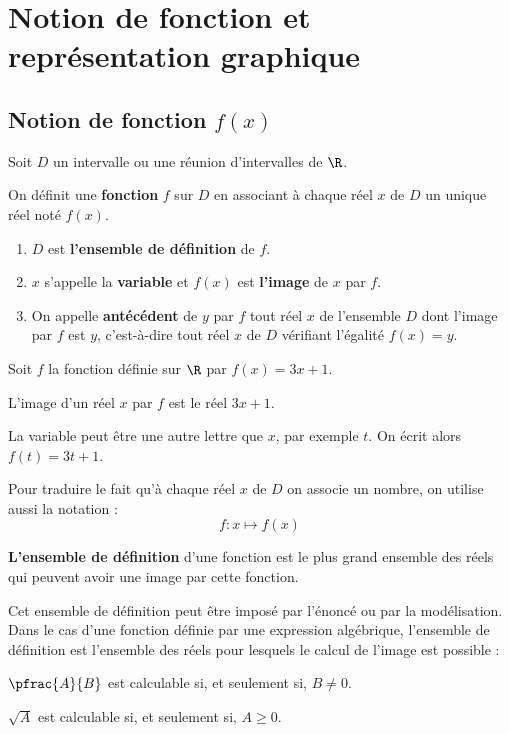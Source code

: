 \chapter{Notion de fonction et représentation graphique}

\section{Notion de fonction $f(x)$}

\begin{definition}[Fonction]
	Soit $D$ un intervalle ou une réunion d'intervalles de $\R$.

	On définit une \textbf{fonction} $f$ sur $D$ en associant à chaque réel $x$ de $D$ un unique réel noté $f(x)$.
	\begin{enumerate}
		\item $D$ est \textbf{l'ensemble de définition} de $f$.
		\item $x$ s'appelle la \textbf{variable} et $f(x)$ est \textbf{l'image} de $x$ par $f$.
		\item On appelle \textbf{antécédent} de $y$ par $f$ tout réel $x$ de l'ensemble $D$ dont l'image par $f$ est $y$, c'est-à-dire tout réel $x$ de $D$ vérifiant l'égalité $f(x) = y$.
	\end{enumerate}
\end{definition}

\begin{exemple}
	Soit $f$ la fonction définie sur $\R$ par $f(x) = 3x + 1$.
	\bi
	\item L'image d'un réel $x$ par $f$ est le réel $3x + 1$.
	\item La variable peut être une autre lettre que $x$, par exemple $t$. On écrit alors $f(t) = 3t + 1$.
	\ei
\end{exemple}

\begin{remarque}
	Pour traduire le fait qu'à chaque réel $x$ de $D$ on associe un nombre, on utilise aussi la notation : $$f : x \mapsto f(x)$$
\end{remarque}

\begin{definition}
	\textbf{L'ensemble de définition} d'une fonction est le plus grand ensemble des réels qui peuvent avoir une image par cette fonction.

	Cet ensemble de définition peut être imposé par l'énoncé ou par la modélisation. Dans le cas d'une fonction définie par une expression algébrique, l'ensemble de définition est l'ensemble des réels pour lesquels le calcul de l'image est possible :
	\bi
	\item $\pfrac{A}{B}$ est calculable si, et seulement si, $B \neq 0$.
	\item $\sqrt{A}$ est calculable si, et seulement si, $A \ge 0$.
	\ei
\end{definition}

